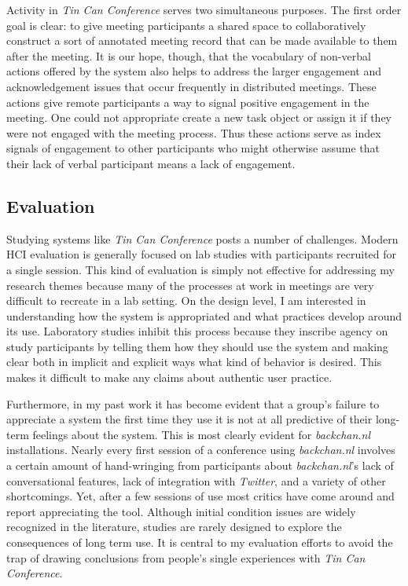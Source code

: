 \documentclass{tufte-handout}
\begin{document}
Activity in \emph{Tin Can Conference} serves two simultaneous purposes. The first order goal is clear: to give meeting participants a shared space to collaboratively construct a sort of annotated meeting record that can be made available to them after the meeting. It is our hope, though, that the vocabulary of non-verbal actions offered by the system also helps to address the larger engagement and acknowledgement issues that occur frequently in distributed meetings. These actions give remote participants a way to signal positive engagement in the meeting. One could not appropriate create a new task object or assign it if they were not engaged with the meeting process. Thus these actions serve as index signals of engagement to other participants who might otherwise assume that their lack of verbal participant means a lack of engagement.



\subsection{Evaluation}

Studying systems like \emph{Tin Can Conference} posts a number of challenges. Modern HCI evaluation is generally focused on lab studies with participants recruited for a single session. This kind of evaluation is simply not effective for addressing my research themes because many of the processes at work in meetings are very difficult to recreate in a lab setting. On the design level, I am interested in understanding how the system is appropriated and what practices develop around its use. Laboratory studies inhibit this process because they inscribe agency on study participants by telling them how they should use the system and making clear both in implicit and explicit ways what kind of behavior is desired. This makes it difficult to make any claims about authentic user practice.

Furthermore, in my past work it has become evident that a group's failure to appreciate a system the first time they use it is not at all predictive of their long-term feelings about the system. This is most clearly evident for \emph{backchan.nl} installations. Nearly every first session of a conference using \emph{backchan.nl} involves a certain amount of hand-wringing from participants about \emph{backchan.nl}'s lack of conversational features, lack of integration with \emph{Twitter}, and a variety of other shortcomings. Yet, after a few sessions of use most critics have come around and report appreciating the tool. Although initial condition issues are widely recognized in the literature, studies are rarely designed to explore the consequences of long term use. It is central to my evaluation efforts to avoid the trap of drawing conclusions from people's single experiences with \emph{Tin Can Conference}.
\end{document}
